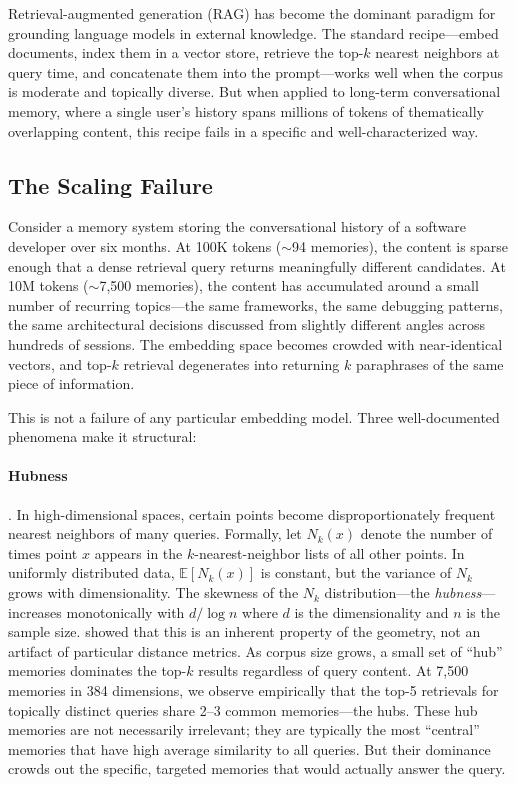 \documentclass[11pt]{article}
\begin{document}
Retrieval-augmented generation (RAG) has become the dominant paradigm
for grounding language models in external knowledge.  The standard
recipe---embed documents, index them in a vector store, retrieve the
top-$k$ nearest neighbors at query time, and concatenate them into the
prompt---works well when the corpus is moderate and topically diverse.
But when applied to long-term conversational memory, where a single
user's history spans millions of tokens of thematically overlapping
content, this recipe fails in a specific and well-characterized way.

\subsection{The Scaling Failure}
\label{sec:scaling-failure}

Consider a memory system storing the conversational history of a
software developer over six months.  At 100K tokens ($\sim$94 memories),
the content is sparse enough that a dense retrieval query returns
meaningfully different candidates.  At 10M tokens ($\sim$7,500 memories),
the content has accumulated around a small number of recurring
topics---the same frameworks, the same debugging patterns, the same
architectural decisions discussed from slightly different angles
across hundreds of sessions.  The embedding space becomes crowded
with near-identical vectors, and top-$k$ retrieval degenerates into
returning $k$ paraphrases of the same piece of information.

This is not a failure of any particular embedding model.  Three
well-documented phenomena make it structural:

\paragraph{Hubness} \citep{Radovanovic2010}.
In high-dimensional spaces, certain points become disproportionately
frequent nearest neighbors of many queries.  Formally, let $N_k(x)$
denote the number of times point $x$ appears in the $k$-nearest-neighbor
lists of all other points.  In uniformly distributed data,
$\mathbb{E}[N_k(x)]$ is constant, but the variance of $N_k$ grows
with dimensionality.  The skewness of the $N_k$ distribution---the
\emph{hubness}---increases monotonically with $d / \log n$ where $d$
is the dimensionality and $n$ is the sample size.
\citet{Radovanovic2010} showed that this is an inherent property of
the geometry, not an artifact of particular distance metrics.  As
corpus size grows, a small set of ``hub'' memories dominates the
top-$k$ results regardless of query content.  At 7,500 memories in
384 dimensions, we observe empirically that the top-5 retrievals for
topically distinct queries share 2--3 common memories---the hubs.
These hub memories are not necessarily irrelevant; they are typically
the most ``central'' memories that have high average similarity to
all queries.  But their dominance crowds out the specific, targeted
memories that would actually answer the query.
\end{document}
